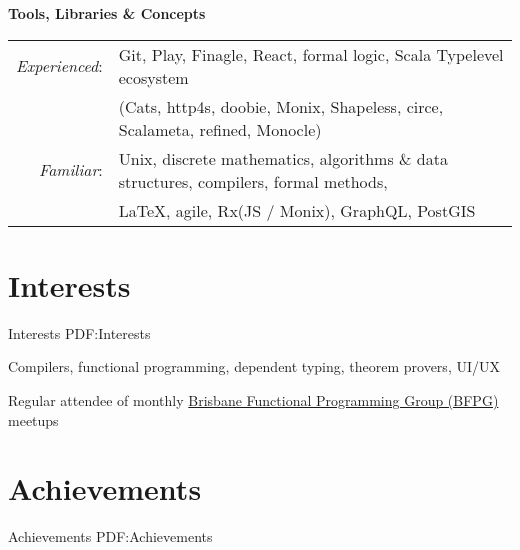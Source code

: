 \documentclass[a4paper,10pt,oneside]{article}
\begin{document}
\begin{body}
\EntryGap
\EntryGap

\textbf{Tools, Libraries \& Concepts}
\EntryGap
\EntryGap

\begin{tabular}{rl}
\par \textit{Experienced}: & Git, Play, Finagle, React, formal logic, Scala Typelevel ecosystem\\
						 & (Cats, http4s, doobie, Monix, Shapeless, circe, Scalameta, refined, Monocle)\\
\par \textit{Familiar}: & Unix, discrete mathematics, algorithms \& data structures, compilers, formal methods,\\ 
                       & \LaTeX, agile, Rx(JS / Monix), GraphQL, PostGIS\\
\end{tabular}

\section
{Interests}
{Interests}
{PDF:Interests}

\par Compilers, functional programming, dependent typing, theorem provers, UI/UX
\par Regular attendee of monthly \href{https://www.meetup.com/en-AU/Brisbane-Functional-Programming-Group/}{Brisbane Functional Programming Group (BFPG)} meetups


\section
{Achievements}
{Achievements}
{PDF:Achievements}





\end{body}
\end{document}

